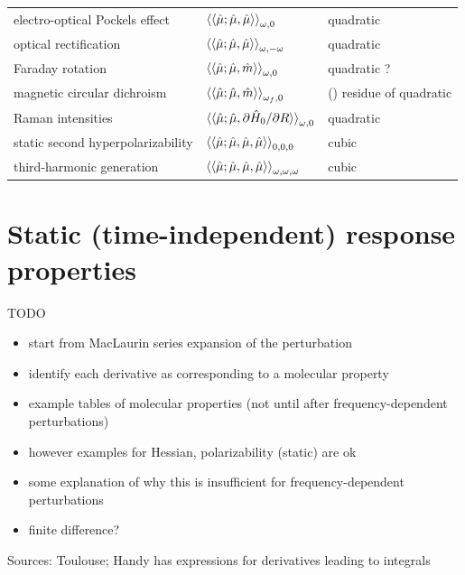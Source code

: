 \documentclass[%
class = book,%
crop = false,%
float = true,%
multi = true,%
preview = false,%
]{standalone}
\begin{document}
\begin{table}
\begin{tabular}{lll}
    electro-optical Pockels effect    & \( \braket{\braket{\hat{\mu};\hat{\mu},\hat{\mu}}}_{\omega,0} \)                       & quadratic \\
    optical rectification             & \( \braket{\braket{\hat{\mu};\hat{\mu},\hat{\mu}}}_{\omega,-\omega} \)                 & quadratic \\
    Faraday rotation                  & \( \braket{\braket{\hat{\mu};\hat{\mu},\hat{m}}}_{\omega,0} \)                         & quadratic ? \\
    magnetic circular dichroism       & \( \braket{\braket{\hat{\mu};\hat{\mu},\hat{m}}}_{\omega_{f},0} \)                     & () residue of quadratic \\
    Raman intensities                 & \( \braket{\braket{\hat{\mu};\hat{\mu},\partial\hat{H}_{0}/\partial R}}_{\omega,0} \)  & quadratic \\
    \midrule
    static second hyperpolarizability & \( \braket{\braket{\hat{\mu};\hat{\mu},\hat{\mu},\hat{\mu}}}_{0,0,0} \)                & cubic \\
    third-harmonic generation         & \( \braket{\braket{\hat{\mu};\hat{\mu},\hat{\mu},\hat{\mu}}}_{\omega,\omega,\omega} \) & cubic \\
    \bottomrule
  \end{tabular}
\end{table}

\section{Static (time-independent) response properties}
\label{sec:static-properties}

TODO

\begin{itemize}
\item start from MacLaurin series expansion of the perturbation
\item identify each derivative as corresponding to a molecular property
\item example tables of molecular properties (not until after frequency-dependent perturbations)
\item however examples for Hessian, polarizability (static) are ok
\item some explanation of why this is insufficient for frequency-dependent perturbations
\item finite difference?
\end{itemize}

Sources: Toulouse; Handy has expressions for derivatives leading to integrals
\end{document}
